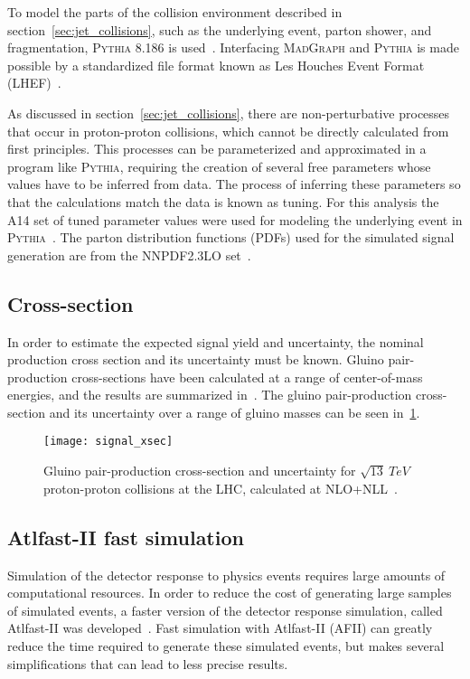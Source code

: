 To model the parts of the collision environment described in section~\ref{sec:jet_collisions}, such as the underlying event, parton shower, and fragmentation, \textsc{Pythia} 8.186 is used~\cite{signal-pythia}.
Interfacing \textsc{MadGraph} and \textsc{Pythia} is made possible by a standardized file format known as Les Houches Event Format (LHEF)~\cite{signal-lhef}.

As discussed in section~\ref{sec:jet_collisions}, there are non-perturbative processes that occur in proton-proton collisions, which cannot be directly calculated from first principles.
This processes can be parameterized and approximated in a program like \textsc{Pythia}, requiring the creation of several free parameters whose values have to be inferred from data.
The process of inferring these parameters so that the calculations match the data is known as tuning.
For this analysis the A14 set of tuned parameter values were used for modeling the underlying event in \textsc{Pythia}~\cite{signal-pythia-a14,signal-pythia-tunes}.
The parton distribution functions (PDFs) used for the simulated signal generation are from the NNPDF2.3LO set~\cite{signal-nnpdf}.

\subsection{Cross-section}\label{subsec:signal_cross_section}
In order to estimate the expected signal yield and uncertainty, the nominal production cross section and its uncertainty must be known.
Gluino pair-production cross-sections have been calculated at a range of center-of-mass energies, and the results are summarized in~\cite{signal-xsec}.
The gluino pair-production cross-section and its uncertainty over a range of gluino masses can be seen in~\ref{fig:signal_xsec}.

\begin{figure}[!ht]\centering
    \texttt{[image: signal\_xsec]}
    \caption{Gluino pair-production cross-section and uncertainty for $\sqrt{13}~TeV$ proton-proton collisions at the LHC, calculated at NLO+NLL~\cite{signal-xsec}.}
    \label{fig:signal_xsec}
\end{figure}

\subsection{Atlfast-II fast simulation}\label{subsec:fastsim}

Simulation of the detector response to physics events requires large amounts of computational resources.
In order to reduce the cost of generating large samples of simulated events, a faster version of the detector response simulation, called Atlfast-II was developed~\cite{mc-atlfast}.
Fast simulation with Atlfast-II (AFII) can greatly reduce the time required to generate these simulated events, but makes several simplifications that can lead to less precise results.

